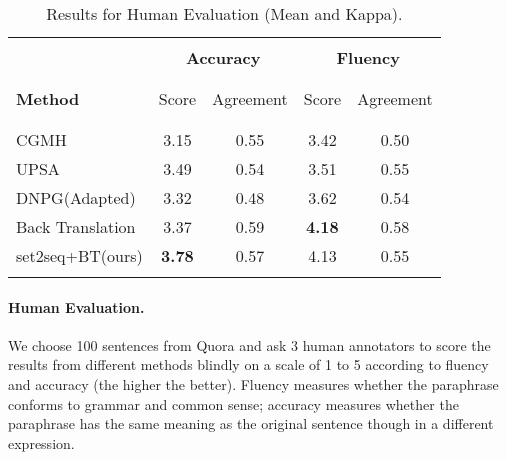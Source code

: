 \begin{table}[th]
\small
\centering
\begin{tabular}{lcccc}
\hline 
\\ [-1.8ex]
& \multicolumn{2}{c}{\textbf{Accuracy}} & \multicolumn{2}{c}{\textbf{Fluency}} \\
\\ [-1.8ex]
\cline{2-5}
\\ [-1.8ex]
\textbf{Method} & Score & Agreement & Score & Agreement \\
\\ [-2ex]
\hline
\\ [-1.8ex]
CGMH & 3.15 & 0.55 & 3.42 & 0.50 \\
UPSA & 3.49 & 0.54 & 3.51 & 0.55 \\
DNPG\scriptsize{(Adapted)} & 3.32 & 0.48 & 3.62 & 0.54 \\
Back Translation & 3.37 & 0.59 & \textbf{4.18} & 0.58 \\
set2seq+BT\scriptsize{(ours)} & \textbf{3.78} &0.57 & 4.13 & 0.55 \\
\\ [-1.8ex]
\hline
\end{tabular}
\caption{\label{tab:human} Results for Human Evaluation (Mean and Kappa). }
\end{table}

\paragraph{Human Evaluation.}
We choose 100 sentences from Quora and ask 3 human annotators to score the 
results from different methods blindly on a scale of 1 to 5 according to 
fluency and accuracy (the higher the better). Fluency measures whether 
the paraphrase conforms to grammar and common sense; accuracy measures 
whether the paraphrase has the same meaning as the original sentence 
though in a different expression.


